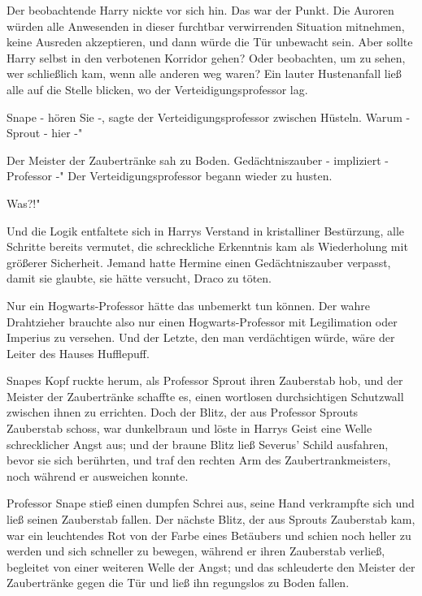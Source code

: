 Der beobachtende Harry nickte vor sich hin. Das war der Punkt. Die Auroren
würden alle Anwesenden in dieser furchtbar verwirrenden Situation mitnehmen,
keine Ausreden akzeptieren, und dann würde die Tür unbewacht sein. Aber sollte
Harry selbst in den verbotenen Korridor gehen? Oder beobachten, um zu sehen, wer
schließlich kam, wenn alle anderen weg waren? Ein lauter Hustenanfall ließ alle
auf die Stelle blicken, wo der Verteidigungsprofessor lag.

\glqq Snape - hören Sie -\grqq{}, sagte der Verteidigungsprofessor zwischen
Hüsteln. \glqq Warum - Sprout - hier -"

Der Meister der Zaubertränke sah zu Boden. \glqq Gedächtniszauber - impliziert -
Professor -" Der Verteidigungsprofessor begann wieder zu husten.

\glqq Was?!"

Und die Logik entfaltete sich in Harrys Verstand in kristalliner Bestürzung,
alle Schritte bereits vermutet, die schreckliche Erkenntnis kam als Wiederholung
mit größerer Sicherheit. Jemand hatte Hermine einen Gedächtniszauber verpasst,
damit sie glaubte, sie hätte versucht, Draco zu töten.

Nur ein Hogwarts-Professor hätte das unbemerkt tun können. Der wahre Drahtzieher
brauchte also nur einen Hogwarts-Professor mit Legilimation oder Imperius zu
versehen. Und der Letzte, den man verdächtigen würde, wäre der Leiter des Hauses
Hufflepuff.

Snapes Kopf ruckte herum, als Professor Sprout ihren Zauberstab hob, und der
Meister der Zaubertränke schaffte es, einen wortlosen durchsichtigen Schutzwall
zwischen ihnen zu errichten. Doch der Blitz, der aus Professor Sprouts
Zauberstab schoss, war dunkelbraun und löste in Harrys Geist eine Welle
schrecklicher Angst aus; und der braune Blitz ließ Severus' Schild ausfahren,
bevor sie sich berührten, und traf den rechten Arm des Zaubertrankmeisters, noch
während er ausweichen konnte.

Professor Snape stieß einen dumpfen Schrei aus, seine Hand verkrampfte sich und
ließ seinen Zauberstab fallen. Der nächste Blitz, der aus Sprouts Zauberstab
kam, war ein leuchtendes Rot von der Farbe eines Betäubers und schien noch
heller zu werden und sich schneller zu bewegen, während er ihren Zauberstab
verließ, begleitet von einer weiteren Welle der Angst; und das schleuderte den
Meister der Zaubertränke gegen die Tür und ließ ihn regungslos zu Boden fallen.

